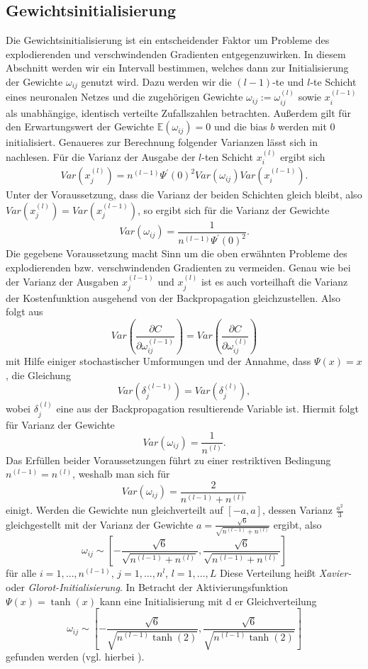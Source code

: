 \subsection{Gewichtsinitialisierung}
\label{subsec:gewichtsinitialisierung}
Die Gewichtsinitialisierung ist ein entscheidender Faktor um Probleme des explodierenden und verschwindenden Gradienten
entgegenzuwirken. In diesem Abschnitt werden wir ein Intervall bestimmen, welches dann zur Initialisierung der Gewichte
$\omega_{ij}$ genutzt wird. Dazu werden wir die $(l-1)$-te und $l$-te Schicht eines neuronalen Netzes und die
zugehörigen Gewichte $\omega_{ij}:=\omega_{ij}^{(l)}$ sowie $x_{i}^{(l-1)}$ als unabhängige, identisch verteilte
Zufallszahlen betrachten. Außerdem gilt für den Erwartungswert der Gewichte $\mathbb{E}(\omega_{ij})=0$ und die bias $b$
werden mit $0$ initialisiert. Genaueres zur Berechnung folgender Varianzen lässt sich in
\cite[191-195]{ovidiucalinDeepLearningArchitectures} nachlesen. Für die Varianz der Ausgabe der $l$-ten Schicht
$x_i^{(l)}$ ergibt sich
\begin{align*}
    Var(x_j^{(l)}) = n^{(l-1)} \Psi^{\prime}(0)^2 Var(\omega_{ij}) Var(x_i^{(l-1)}).
\end{align*}
Unter der Voraussetzung, dass die Varianz der beiden Schichten gleich bleibt, also \\
$Var(x_j^{(l)})=Var(x_j^{(l-1)})$, so ergibt sich für die Varianz der Gewichte
\[
    Var(\omega_{ij}) = \frac{1}{n^{(l-1)}\Psi^{\prime}(0)^2}.
\]
Die gegebene Voraussetzung macht Sinn um die oben erwähnten Probleme des explodierenden bzw. verschwindenden Gradienten
zu vermeiden. Genau wie bei der Varianz der Ausgaben $x_j^{(l-1)}$ und $x_j^{(l)}$ ist es auch vorteilhaft die Varianz
der Kostenfunktion ausgehend von der Backpropagation gleichzustellen. Also folgt aus
\[
    Var(\frac{\partial C}{\partial \omega_{ij}^{(l-1)}}) = Var(\frac{\partial C}{\partial \omega_{ij}^{(l)}})
\]
mit Hilfe einiger stochastischer Umformungen und der Annahme, dass $\Psi(x)=x$, die Gleichung
\[
    Var(\delta_j^{(l-1)}) = Var(\delta_j^{(l)}),
\]
wobei $\delta_j^{(l)}$ eine aus der Backpropagation resultierende Variable ist. Hiermit folgt für Varianz der Gewichte
\[
    Var(\omega_{ij}) = \frac{1}{n^{(l)}}.
\]
Das Erfüllen beider Voraussetzungen führt zu einer restriktiven Bedingung $n^{(l-1)} = n^{(l)}$, weshalb man sich für
\[
    Var(\omega_{ij})= \frac{2}{n^{(l-1)} + n^{(l)}}
\]
einigt. Werden die Gewichte nun gleichverteilt auf $[-a,a]$, dessen Varianz $\frac{a^2}{3}$ gleichgestellt mit der
Varianz der Gewichte $a=\frac{\sqrt {6}}{\sqrt {n^{(l-1)} + n^{(l)}}}$ ergibt, also
\[
    \omega_{ij} \sim
    \left[ -\frac{\sqrt {6}}{\sqrt {n^{(l-1)} + n^{(l)}}}, \frac{\sqrt {6}}{\sqrt {n^{(l-1)} + n^{(l)}}} \right]
\]
für alle $i = 1, \dots, n^{(l-1)}$, $j=1,\dots,n^{l}$, $l=1,\dots,L$ Diese Verteilung heißt \textit{Xavier-} oder
\textit{Glorot-Initialisierung}. In Betracht der Aktivierungsfunktion $\Psi(x)=\tanh(x)$ kann eine Initialisierung mit d
er Gleichverteilung
\[
    \omega_{ij} \sim
    \left[ -\frac{\sqrt {6}}{\sqrt {n^{(l-1)} \tanh(2)}}, \frac{\sqrt {6}}{\sqrt {n^{(l-1)} \tanh(2)}} \right]
\]
gefunden werden (vgl. hierbei \cite[27]{remcovandermeerSolvingPartialDifferential}).

